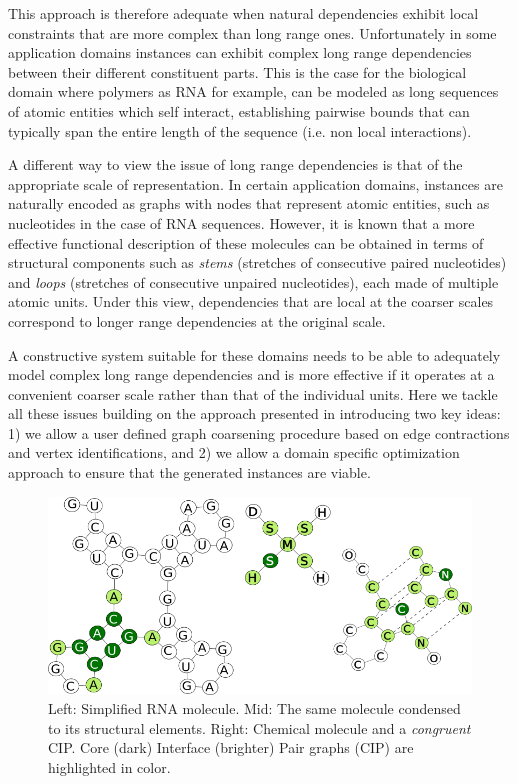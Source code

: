 \documentclass{article}
\begin{document}
This approach is therefore adequate when natural dependencies exhibit local
constraints that are more complex than long range ones.  Unfortunately in
some application domains instances can exhibit complex long range
dependencies between their different constituent parts. This is the case for
the biological domain where polymers as RNA for example, can be modeled as
long sequences of atomic entities which self interact, establishing pairwise
bounds that can typically span the entire length of the sequence (i.e. non
local interactions).

A different way to view the issue of long range dependencies is that of the
appropriate scale of representation. In certain application domains, instances
are naturally encoded as graphs with nodes that represent atomic entities,
such as nucleotides in the case of RNA sequences. However, it is known that a
more effective functional description of these molecules can be obtained in
terms of structural components such as {\em stems} (stretches of consecutive
paired nucleotides) and {\em loops} (stretches of consecutive unpaired
nucleotides), each made of multiple atomic units. Under this view,
dependencies that are local at the coarser scales correspond to longer range
dependencies at the original scale.

A constructive system suitable for these domains needs to be able to
adequately model complex long range dependencies and is more effective if it
operates at a convenient coarser scale rather than that of the individual
units. Here we tackle all these issues building on the approach presented in
\cite{costa16} introducing two key ideas: 1) we allow a user defined graph
coarsening procedure based on edge contractions and vertex identifications,
and 2) we allow a domain specific optimization approach to ensure that the
generated instances are viable.

%
\begin{figure}[ht]
      \centering
        \includegraphics[width=1.0\linewidth]{images/allcipsinone.png}
      \caption{Left: Simplified RNA molecule. Mid: The same molecule
      condensed to its structural elements. Right: Chemical molecule and a
      \emph{congruent} CIP. Core (dark) Interface (brighter) Pair graphs (CIP)
      are
      highlighted in color.}
      \label{allcips}
\end{figure}
\end{document}

